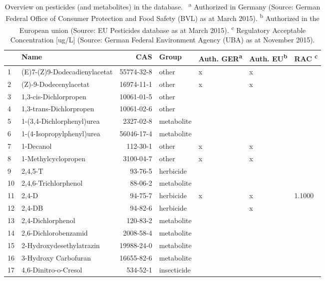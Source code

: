 \begin{longtable}{lp{4cm}rlp{1.3cm}p{1.3cm}p{1.5cm}}
\caption[Overview on pesticides in the database.]{Overview on pesticides (and metabolites) in the database. \
                    \textsuperscript{a} Authorized in Germany (Source: German Federal Office of Consumer Protection and Food Safety (BVL) as at March 2015). 
                    \textsuperscript{b} Authorized in the European union (Source: EU Pesticides database as at March 2015).
                    \textsuperscript{c} Regulatory Acceptable Concentration [ug/L] (Source: German Federal Environment Agency (UBA) as at November 2015).} \\ 
  \toprule
 & Name & CAS & Group & Auth. GER\textsuperscript{a} & Auth. EU\textsuperscript{b} & RAC \textsuperscript{c} \\ 
  \midrule
1 & (E)7-(Z)9-Dodecadienylacetat & 55774-32-8 & other & x & x &  \\ 
  2 & (Z)-9-Dodecenylacetat & 16974-11-1 & other & x & x &  \\ 
  3 & 1,3-cis-Dichlorpropen & 10061-01-5 & other &  &  &  \\ 
  4 & 1,3-trans-Dichlorpropen & 10061-02-6 & other &  &  &  \\ 
  5 & 1-(3,4-Dichlorphenyl)urea & 2327-02-8 & metabolite &  &  &  \\ 
  6 & 1-(4-Isopropylphenyl)urea & 56046-17-4 & metabolite &  &  &  \\ 
  7 & 1-Decanol & 112-30-1 & other & x & x &  \\ 
  8 & 1-Methylcyclopropen & 3100-04-7 & other & x & x &  \\ 
  9 & 2,4,5-T & 93-76-5 & herbicide &  &  &  \\ 
  10 & 2,4,6-Trichlorphenol & 88-06-2 & metabolite &  &  &  \\ 
  11 & 2,4-D & 94-75-7 & herbicide & x & x & 1.1000 \\ 
  12 & 2,4-DB & 94-82-6 & herbicide &  & x &  \\ 
  13 & 2,4-Dichlorphenol & 120-83-2 & metabolite &  &  &  \\ 
  14 & 2,6-Dichlorobenzamid & 2008-58-4 & metabolite &  &  &  \\ 
  15 & 2-Hydroxydesethylatrazin & 19988-24-0 & metabolite &  &  &  \\ 
  16 & 3-Hydroxy Carbofuran & 16655-82-6 & metabolite &  &  &  \\ 
  17 & 4,6-Dinitro-o-Cresol & 534-52-1 & insecticide &  &  &  \\ 

\end{longtable}
